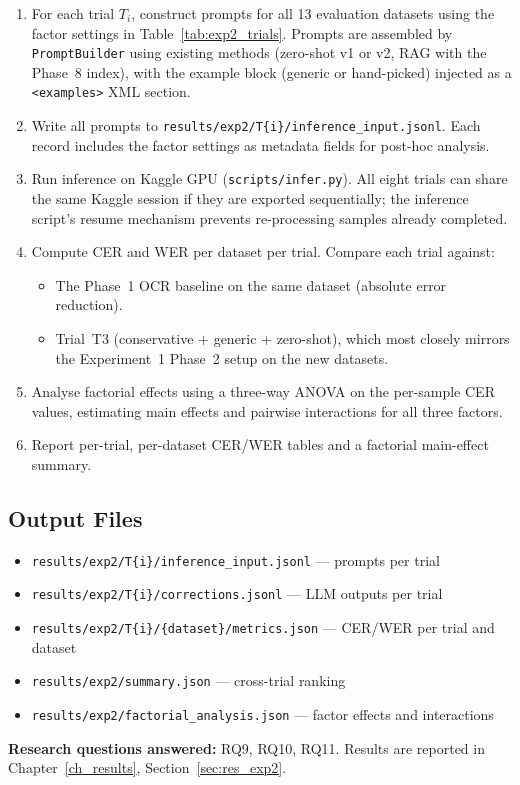 \begin{enumerate}
  \item For each trial $T_i$, construct prompts for all 13 evaluation datasets
        using the factor settings in Table~\ref{tab:exp2_trials}.
        Prompts are assembled by \texttt{PromptBuilder} using existing methods
        (zero-shot v1 or v2, RAG with the Phase~8 index), with the example
        block (generic or hand-picked) injected as a \texttt{<examples>}
        XML section.

  \item Write all prompts to
        \texttt{results/exp2/T\{i\}/inference\_input.jsonl}.
        Each record includes the factor settings as metadata fields for
        post-hoc analysis.

  \item Run inference on Kaggle GPU (\texttt{scripts/infer.py}).
        All eight trials can share the same Kaggle session if they are
        exported sequentially; the inference script's resume mechanism
        prevents re-processing samples already completed.

  \item Compute CER and WER per dataset per trial.
        Compare each trial against:
        \begin{itemize}
          \item The Phase~1 OCR baseline on the same dataset (absolute
                error reduction).
          \item Trial~T3 (conservative + generic + zero-shot), which
                most closely mirrors the Experiment~1 Phase~2 setup on
                the new datasets.
        \end{itemize}

  \item Analyse factorial effects using a three-way ANOVA on the per-sample
        CER values, estimating main effects and pairwise interactions for
        all three factors.

  \item Report per-trial, per-dataset CER/WER tables and a factorial
        main-effect summary.
\end{enumerate}

\subsection{Output Files}
\begin{itemize}
  \item \texttt{results/exp2/T\{i\}/inference\_input.jsonl} --- prompts per trial
  \item \texttt{results/exp2/T\{i\}/corrections.jsonl} --- LLM outputs per trial
  \item \texttt{results/exp2/T\{i\}/\{dataset\}/metrics.json} --- CER/WER per trial and dataset
  \item \texttt{results/exp2/summary.json} --- cross-trial ranking
  \item \texttt{results/exp2/factorial\_analysis.json} --- factor effects and interactions
\end{itemize}

\noindent
\textbf{Research questions answered:} RQ9, RQ10, RQ11.
Results are reported in Chapter~\ref{ch_results}, Section~\ref{sec:res_exp2}.
